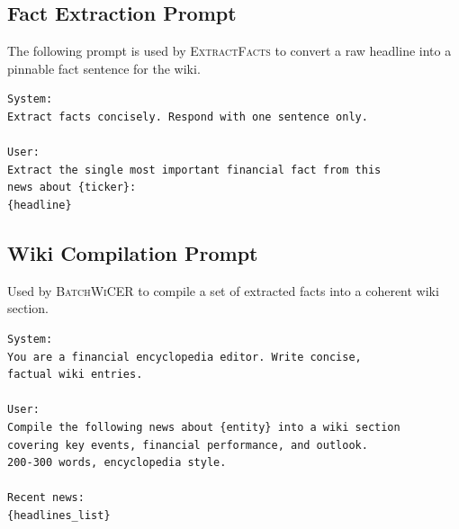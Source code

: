 \documentclass{article}
\begin{document}
\subsection{Fact Extraction Prompt}

The following prompt is used by \textsc{ExtractFacts} to convert a raw headline into a
pinnable fact sentence for the wiki.

\begin{lstlisting}[caption={Fact extraction prompt (exact text).}]
System:
Extract facts concisely. Respond with one sentence only.

User:
Extract the single most important financial fact from this
news about {ticker}:
{headline}
\end{lstlisting}

\subsection{Wiki Compilation Prompt}

Used by \textsc{BatchWiCER} to compile a set of extracted facts into a coherent wiki section.

\begin{lstlisting}[caption={Wiki compilation prompt (exact text).}]
System:
You are a financial encyclopedia editor. Write concise,
factual wiki entries.

User:
Compile the following news about {entity} into a wiki section
covering key events, financial performance, and outlook.
200-300 words, encyclopedia style.

Recent news:
{headlines_list}
\end{lstlisting}
\end{document}
